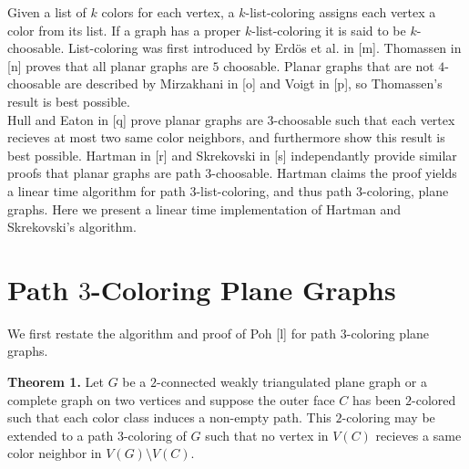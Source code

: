 \documentclass[11pt,letter]{article}
\begin{document}
\noindent Given a list of $k$ colors for each vertex, a $k$-list-coloring assigns each vertex a color from its list.
If a graph has a proper $k$-list-coloring it is said to be $k$-choosable. List-coloring was first introduced by
Erd{\"o}s et al. in [m]. Thomassen in [n] proves that all planar graphs are $5$ choosable. Planar
graphs that are not $4$-choosable are described by Mirzakhani in [o] and Voigt in [p], so Thomassen's result
is best possible.\\

\noindent Hull and Eaton in [q] prove planar graphs are $3$-choosable such that each vertex recieves at most two
same color neighbors, and furthermore show this result is best possible. Hartman in [r] and Skrekovski in [s] independantly
provide similar proofs that planar graphs are path $3$-choosable. Hartman claims the proof yields
a linear time algorithm for path $3$-list-coloring, and thus path $3$-coloring, plane graphs. Here we present a
linear time implementation of Hartman and Skrekovski's algorithm.\\

\section{Path $3$-Coloring Plane Graphs}

We first restate the algorithm and proof of Poh [l] for path $3$-coloring plane graphs.\\

\begin{adjustwidth}{1.5em}{1.5em}
\noindent\textbf{Theorem 1.} Let $G$ be a $2$-connected weakly triangulated plane graph or a complete
graph on two vertices and
suppose the outer face $C$ has been $2$-colored such that each color class induces a non-empty path. This
$2$-coloring may be extended to a path $3$-coloring of $G$ such that no vertex in $V(C)$ recieves a same color
neighbor in $V(G)\setminus V(C)$.\\
\end{adjustwidth}
\end{document}
